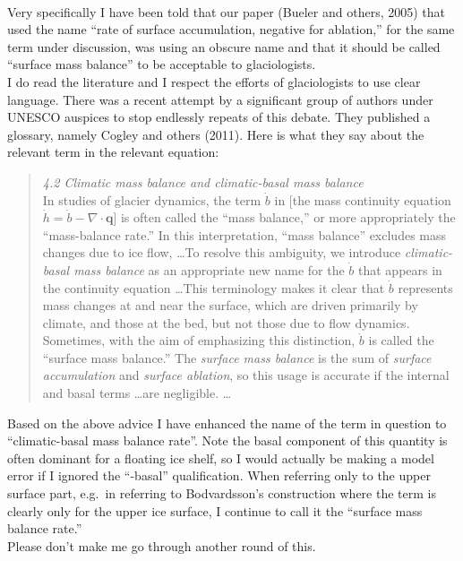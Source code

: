 \documentclass[11pt,reqno]{amsart}
\begin{document}
\begin{itemize}
{\medskip \\
Very specifically I have been told that our paper (Bueler and others, 2005) that used the name ``rate of surface accumulation, negative for ablation,'' for the same term under discussion, was using an obscure name and that it should be called ``surface mass balance'' to be acceptable to glaciologists.
\medskip \\
I do read the literature and I respect the efforts of glaciologists to use clear language.  There was a recent attempt by a significant group of authors under UNESCO auspices to stop endlessly repeats of this debate.  They published a glossary, namely Cogley and others (2011).  Here is what they say about the relevant term in the relevant equation: \\
\begin{quote}
\emph{4.2 Climatic mass balance and climatic-basal mass balance}
\smallskip \\
In studies of glacier dynamics, the term $\dot b$ in [the mass continuity equation $\dot h = \dot b - \nabla \cdot \mathbf{q}$] is often called the ``mass balance,'' or more appropriately the ``mass-balance rate.''  In this interpretation, ``mass balance'' excludes mass changes due to ice flow, \dots  To resolve this ambiguity, we introduce \emph{climatic-basal mass balance} as an appropriate new name for the $\dot b$ that appears in the continuity equation \dots  This terminology makes it clear that $\dot b$ represents mass changes at and near the surface, which are driven primarily by climate, and those at the bed, but not those due to flow dynamics.
\smallskip \\
Sometimes, with the aim of emphasizing this distinction, $\dot b$ is called the ``surface mass balance.''  The \emph{surface mass balance} is the sum of \emph{surface accumulation} and \emph{surface ablation}, so this usage is accurate if the internal and basal terms \dots are negligible.  \dots
\end{quote} \medskip
Based on the above advice I have enhanced the name of the term in question to ``climatic-basal mass balance rate''.  Note the basal component of this quantity is often dominant for a floating ice shelf, so I would actually be making a model error if I ignored the ``-basal'' qualification.  When referring only to the upper surface part, e.g.~in referring to Bodvardsson's construction where the term is clearly only for the upper ice surface, I continue to call it the ``surface mass balance rate.'' \medskip \\
Please don't make me go through another round of this.}

\end{itemize}


%
%
\end{document}

